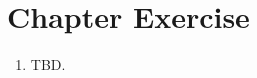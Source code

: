 \documentclass[../main.tex]{subfiles}
\begin{document}
\section{Chapter Exercise}
\begin{enumerate}
    \item TBD.
\end{enumerate}
\end{document}
